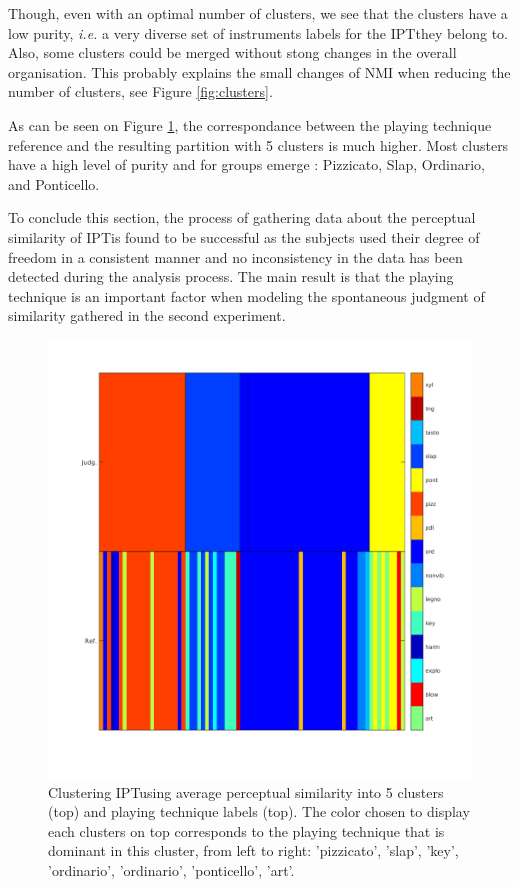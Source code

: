 \documentclass{article}
\newcommand{\ipt}{IPT}
\begin{document}
Though, even with an optimal number of clusters, we see that the clusters have  a low purity, \textit{i.e.} a very diverse set of instruments labels for the \ipt they belong to. Also, some clusters could be merged without stong changes in the overall organisation. This probably explains the small changes of NMI when reducing the number of clusters, see Figure \ref{fig:clusters}.

As can be seen on Figure \ref{fig:gm}, the correspondance between the playing technique reference and the resulting partition with 5 clusters is much higher. Most clusters have a high level of purity and for groups emerge : Pizzicato, Slap, Ordinario, and Ponticello.

To conclude this section, the process of gathering data about the perceptual similarity of \ipt is found to be successful as the subjects used their degree of freedom in a consistent manner and no inconsistency in the data has been detected during the analysis process. The main result is that the playing technique is an important factor when modeling the spontaneous judgment of similarity gathered in the second experiment.


\begin{figure}
\center
\includegraphics[width = \textwidth]{figures/groupModes.png}
\caption{Clustering \ipt using average perceptual similarity into 5 clusters (top) and playing technique labels (top). The color chosen to display each clusters on top corresponds to the playing technique that is dominant in this cluster, from left to right: 'pizzicato', 'slap', 'key', 'ordinario', 'ordinario', 'ponticello', 'art'.}
\label{fig:gm}
\end{figure}
\end{document}
